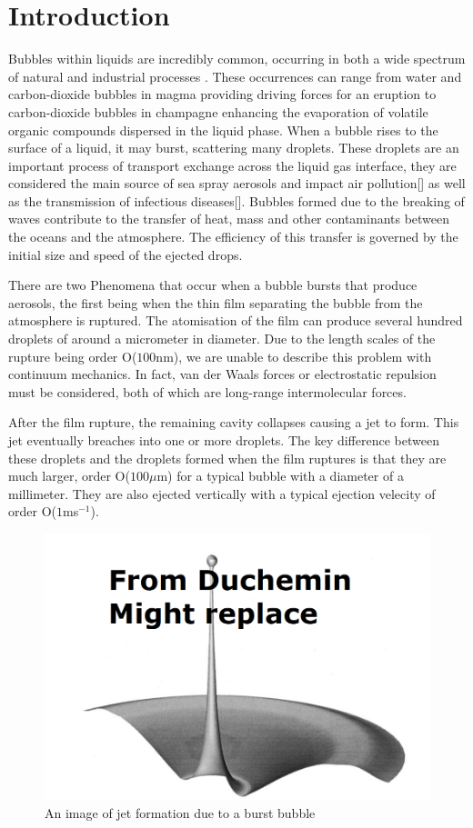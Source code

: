 \section{Introduction}

Bubbles within liquids are incredibly common, occurring in both a wide spectrum of natural and industrial processes \cite{Volcano,bird2010daughter,deike2022mass,dollet2019bubble,feng2014nanoemulsions,oratis2020new,veron2015ocean,WINE}. These occurrences can range from water and carbon-dioxide bubbles in magma providing driving forces for an eruption \cite{Volcano} to carbon-dioxide bubbles in champagne enhancing the evaporation of volatile organic compounds dispersed in the liquid phase. When a bubble rises to the surface of a liquid, it may burst, scattering many droplets. These droplets are an important process of transport exchange across the liquid gas interface\cite{notdoneyet}, they are considered the main source of sea spray aerosols and impact air pollution[] as well as the transmission of infectious diseases[]. Bubbles formed due to the breaking of waves contribute to the transfer of heat, mass and other contaminants between the oceans and the atmosphere. The efficiency of this transfer is governed by the initial size and speed of the ejected drops.

There are two Phenomena that occur when a bubble bursts that produce aerosols, the first being when the thin film separating the bubble from the atmosphere is ruptured. The atomisation of the film can produce several hundred droplets of around a micrometer in diameter. Due to the length scales of the rupture being order O($100$nm), we are unable to describe this problem with continuum mechanics. In fact, van der Waals forces or electrostatic repulsion must be considered, both of which are long-range intermolecular forces.

After the film rupture, the remaining cavity collapses causing a jet to form. This jet eventually breaches into one or more droplets. The key difference between these droplets and the droplets formed when the film ruptures is that they are much larger, order O($100 \mu$m) for a typical bubble with a diameter of a millimeter. They are also ejected vertically with a typical ejection velecity of order O($1$ms$^{-1}$).
\begin{figure}[hb]
    \centering
    \includegraphics[width=0.55\linewidth]{WriteUp/images/Untitled.png}
    \caption{An image of jet formation due to a burst bubble}
    \label{fig:1}
\end{figure}

